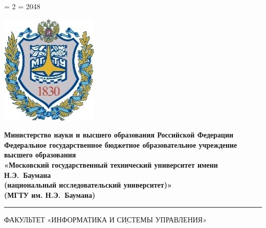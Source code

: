 \documentclass[12pt,a4paper,oneside]{report}
\begin{document}


\setcounter{tocdepth}{4} %
\righthyphenmin = 2
\tolerance = 2048


\thispagestyle{empty}

\thispagestyle{empty}
\noindent \begin{minipage}{0.15\textwidth}
	\includegraphics[width=\linewidth]{b_logo}
\end{minipage}
\noindent\begin{minipage}{0.9\textwidth}\centering
	\textbf{Министерство науки и высшего образования Российской Федерации}\\
	\textbf{Федеральное государственное бюджетное образовательное учреждение высшего образования}\\
	\textbf{«Московский государственный технический университет имени Н.Э.~Баумана}\\
	\textbf{(национальный исследовательский университет)»}\\
	\textbf{(МГТУ им. Н.Э.~Баумана)}
\end{minipage}
\noindent\rule{18cm}{3pt}
\newline\newline
\noindent ФАКУЛЬТЕТ $\underline{\textbf{«ИНФОРМАТИКА И СИСТЕМЫ УПРАВЛЕНИЯ»}}$ \newline\newline
\end{document}
